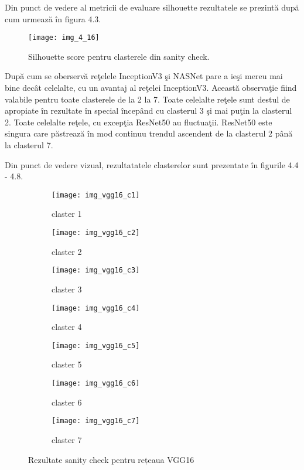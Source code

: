 Din punct de vedere al metricii de evaluare silhouette rezultatele se prezintă după cum urmează în figura 4.3.
\begin{figure}[!h]
	\centering
	\texttt{[image: img\_4\_16]}
	\caption[Silhouette score pentru clasterele din sanity check]{Silhouette score pentru clasterele din sanity check.}
\end{figure} 
După cum se oberservă reţelele InceptionV3 şi NASNet pare a ieşi
mereu mai bine decât celelalte, cu un avantaj al reţelei InceptionV3. Această observaţie
fiind valabile pentru toate clasterele de la 2 la 7. Toate celelalte reţele sunt destul de
apropiate în rezultate în special începând cu clasterul 3 şi mai puţin la clasterul 2. Toate
celelalte reţele, cu excepţia ResNet50 au fluctuaţii. ResNet50 este singura care păstrează
în mod continuu trendul ascendent de la clasterul 2 până la clasterul 7.

Din punct de vedere vizual, rezultatatele clasterelor sunt prezentate în figurile 4.4 - 4.8.
\begin{figure}[!tbp]
  \centering
  \begin{subfigure}[b]{0.45\textwidth}
    \texttt{[image: img\_vgg16\_c1]}
    \caption{claster 1}
  \end{subfigure}
  \hfill
  \begin{subfigure}[b]{0.45\textwidth}
    \texttt{[image: img\_vgg16\_c2]}
    \caption{claster 2}
  \end{subfigure}
   \hfill
  \begin{subfigure}[b]{0.45\textwidth}
    \texttt{[image: img\_vgg16\_c3]}
    \caption{claster 3}
  \end{subfigure}
  \hfill
  \begin{subfigure}[b]{0.45\textwidth}
    \texttt{[image: img\_vgg16\_c4]}
    \caption{claster 4}
  \end{subfigure}
  \hfill
  \begin{subfigure}[b]{0.45\textwidth}
    \texttt{[image: img\_vgg16\_c5]}
    \caption{claster 5}
  \end{subfigure}
  \hfill
  \begin{subfigure}[b]{0.45\textwidth}
    \texttt{[image: img\_vgg16\_c6]}
    \caption{claster 6}
  \end{subfigure}
    \hfill
  \begin{subfigure}[b]{0.45\textwidth}
    \texttt{[image: img\_vgg16\_c7]}
    \caption{claster 7}
  \end{subfigure}
  \caption[Rezultate sanity check pentru rețeaua VGG16]{Rezultate sanity check pentru rețeaua VGG16}
\end{figure}


